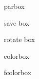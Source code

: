 \documentclass[ aspectratio=149,  14pt,blue,xcolor=pdftex,dvipsnames,table,handout,notes]{beamer}
\begin{document}
\begin{frame}[t]{parbox}
			\begin{block} {save box}
			\end{block}


			\begin{block} {rotate box}
			\end{block}


			\begin{block} {colorbox}
			\end{block}


			\begin{block} {fcolorbox}
			\end{block}

		
		\end{frame}



\end{document}
